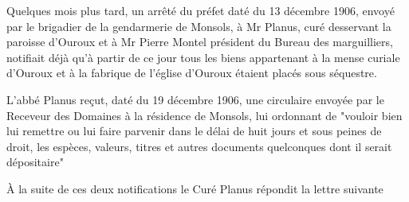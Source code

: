 Quelques mois plus tard, un arrêté du préfet daté du 13 décembre 1906, envoyé par le brigadier de la gendarmerie de Monsols, à Mr Planus, curé desservant la paroisse d'Ouroux et à Mr Pierre Montel président du Bureau des marguilliers, notifiait déjà qu'à partir de ce jour tous les biens appartenant à la mense curiale d'Ouroux et à la fabrique de l'église d'Ouroux étaient placés sous séquestre.

L'abbé Planus reçut, daté du 19 décembre 1906, une circulaire envoyée par le Receveur des Domaines à la résidence de Monsols, lui ordonnant de "vouloir bien lui remettre ou lui faire parvenir dans le délai de huit jours et sous peines de droit, les espèces, valeurs, titres et autres documents quelconques dont il serait dépositaire"

À la suite de ces deux notifications le Curé Planus répondit la lettre suivante

